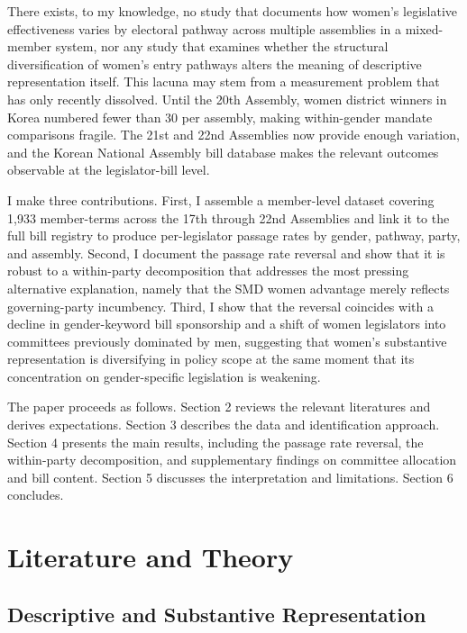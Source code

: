\documentclass[11pt]{article}
\begin{document}
There exists, to my knowledge, no study that documents how women's legislative effectiveness varies by electoral pathway across multiple assemblies in a mixed-member system, nor any study that examines whether the structural diversification of women's entry pathways alters the meaning of descriptive representation itself. This lacuna may stem from a measurement problem that has only recently dissolved. Until the 20th Assembly, women district winners in Korea numbered fewer than 30 per assembly, making within-gender mandate comparisons fragile. The 21st and 22nd Assemblies now provide enough variation, and the Korean National Assembly bill database makes the relevant outcomes observable at the legislator-bill level.

I make three contributions. First, I assemble a member-level dataset covering 1,933 member-terms across the 17th through 22nd Assemblies and link it to the full bill registry to produce per-legislator passage rates by gender, pathway, party, and assembly. Second, I document the passage rate reversal and show that it is robust to a within-party decomposition that addresses the most pressing alternative explanation, namely that the SMD women advantage merely reflects governing-party incumbency. Third, I show that the reversal coincides with a decline in gender-keyword bill sponsorship and a shift of women legislators into committees previously dominated by men, suggesting that women's substantive representation is diversifying in policy scope at the same moment that its concentration on gender-specific legislation is weakening.

The paper proceeds as follows. Section 2 reviews the relevant literatures and derives expectations. Section 3 describes the data and identification approach. Section 4 presents the main results, including the passage rate reversal, the within-party decomposition, and supplementary findings on committee allocation and bill content. Section 5 discusses the interpretation and limitations. Section 6 concludes.

\section{Literature and Theory}

\subsection{Descriptive and Substantive Representation}
\end{document}
